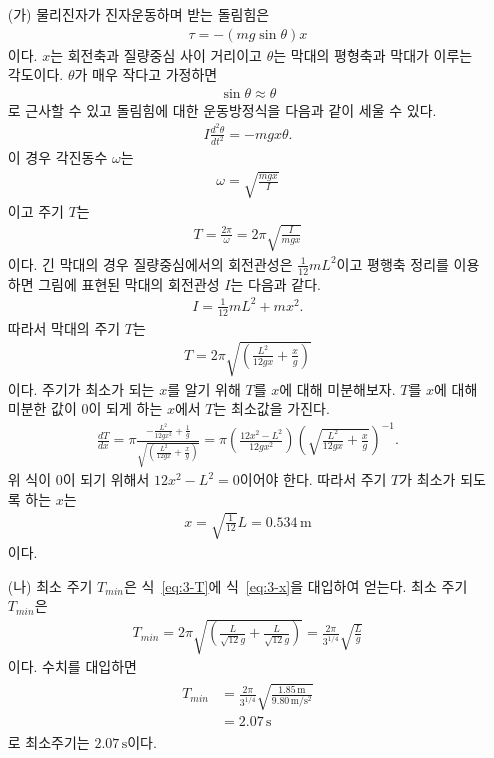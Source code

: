 \documentclass[floatfix,nofootinbib,superscriptaddress,fleqn]{revtex4-2}
\begin{document}
\begin{itemize}
  \item[(가)] 물리진자가 진자운동하며 받는 돌림힘은 
  \begin{align}\label{eq:3-T}
    \tau = -(mg\sin\theta)x
  \end{align}
  이다. $x$는 회전축과 질량중심 사이 거리이고
   $\theta$는 막대의 평형축과 막대가 이루는 각도이다. $\theta$가 매우 작다고 가정하면
   \begin{align}
     \sin\theta \approx \theta
   \end{align}
로 근사할 수 있고 돌림힘에 대한 운동방정식을 다음과 같이 세울 수 있다.
\begin{align}
  I\frac{d^2\theta}{dt^2}=-mgx\theta.
\end{align}
이 경우 각진동수 $\omega$는
\begin{align}
  \omega = \sqrt{\frac{mgx}{I}}
\end{align}
이고 주기 $T$는
\begin{align}
  T = \frac{2\pi}{\omega}=2\pi \sqrt{\frac{I}{mgx}}
\end{align}
이다. 긴 막대의 경우 질량중심에서의 회전관성은 $\frac{1}{12}mL^2$이고 
평행축 정리를 이용하면 그림에 표현된 막대의 회전관성 $I$는 다음과 같다.
\begin{align}
  I = \frac{1}{12}mL^2 + mx^2.
\end{align}
따라서 막대의 주기 $T$는
\begin{align}\label{eq:3-T}
  T = 2\pi \sqrt{\left(\frac{L^2}{12gx} 
  + \frac{x}{g}\right)}
\end{align}
이다. 주기가 최소가 되는 $x$를 알기 위해 $T$를 $x$에 대해 미분해보자.
$T$를 $x$에 대해 미분한 값이 $0$이 되게 하는 $x$에서 $T$는 최소값을 가진다.
\begin{align}
  \frac{dT}{dx} = \pi \frac{-\frac{L^2}{12gx^2}+\frac{1}{g}}
  {\sqrt{\left(\frac{L^2}{12gx} + \frac{x}{g}\right)}}
  =\pi \left(\frac{12x^2-L^2}{12gx^2}\right)
  {\left(\sqrt{\frac{L^2}{12gx} + \frac{x}{g}}\right)}^{-1}.
\end{align}
위 식이 $0$이 되기 위해서 $12x^2-L^2=0$이어야 한다. 따라서 주기 $T$가
최소가 되도록 하는 $x$는
\begin{align}\label{eq:3-x}
  x = \sqrt{\frac{1}{12}}L = 0.534\,\mathrm{m}
\end{align}
이다.
  \item[(나)] 최소 주기 $T_{min}$은 식~\eqref{eq:3-T}에 식~\eqref{eq:3-x}을
  대입하여 얻는다. 최소 주기 $T_{min}$은
  \begin{align}
    T_{min} =  2\pi \sqrt{\left(\frac{L}{\sqrt{12}g} 
    + \frac{L}{\sqrt{12}g}\right)}
    =\frac{2\pi}{3^{1/4}}\sqrt{\frac{L}{g}}
  \end{align}
  이다. 수치를 대입하면
  \begin{align}
    \begin{split}
      T_{min} &= \frac{2\pi}{3^{1/4}}\sqrt{\frac{1.85\,\mathrm{m}}{9.80\,\mathrm{m/s^2}}} \\
      &=2.07\,\mathrm{s}
    \end{split}
  \end{align}
  로 최소주기는 $2.07\,\mathrm{s}$이다.
\end{itemize}  
\end{document}
